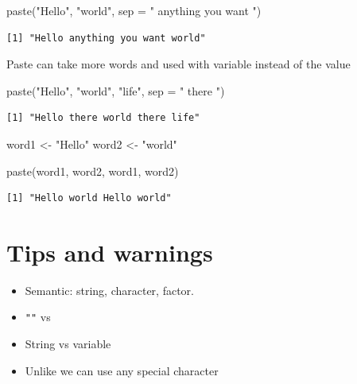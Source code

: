 \documentclass[
  letterpaper,
  DIV=11,
  numbers=noendperiod]{scrreprt}
\newenvironment{Shaded}{\begin{snugshade}}{\end{snugshade}}
\newcommand{\AttributeTok}[1]{\textcolor[rgb]{0.40,0.45,0.13}{#1}}
\newcommand{\FunctionTok}[1]{\textcolor[rgb]{0.28,0.35,0.67}{#1}}
\newcommand{\NormalTok}[1]{\textcolor[rgb]{0.00,0.23,0.31}{#1}}
\newcommand{\OtherTok}[1]{\textcolor[rgb]{0.00,0.23,0.31}{#1}}
\newcommand{\StringTok}[1]{\textcolor[rgb]{0.13,0.47,0.30}{#1}}
\providecommand{\tightlist}{%
  \setlength{\itemsep}{0pt}\setlength{\parskip}{0pt}}
\begin{document}
\begin{Shaded}
\begin{Highlighting}[]
\FunctionTok{paste}\NormalTok{(}\StringTok{"Hello"}\NormalTok{, }\StringTok{"world"}\NormalTok{, }\AttributeTok{sep =} \StringTok{" anything you want "}\NormalTok{)}
\end{Highlighting}
\end{Shaded}

\begin{verbatim}
[1] "Hello anything you want world"
\end{verbatim}

Paste can take more words and used with variable instead of the value

\begin{Shaded}
\begin{Highlighting}[]
\FunctionTok{paste}\NormalTok{(}\StringTok{"Hello"}\NormalTok{, }\StringTok{"world"}\NormalTok{, }\StringTok{"life"}\NormalTok{, }\AttributeTok{sep =} \StringTok{" there "}\NormalTok{)}
\end{Highlighting}
\end{Shaded}

\begin{verbatim}
[1] "Hello there world there life"
\end{verbatim}

\begin{Shaded}
\begin{Highlighting}[]
\NormalTok{word1 }\OtherTok{\textless{}{-}} \StringTok{"Hello"}
\NormalTok{word2 }\OtherTok{\textless{}{-}} \StringTok{"world"}

\FunctionTok{paste}\NormalTok{(word1, word2, word1, word2)}
\end{Highlighting}
\end{Shaded}

\begin{verbatim}
[1] "Hello world Hello world"
\end{verbatim}

\section*{Tips and warnings}\label{tips-and-warnings-24}


\begin{itemize}
\tightlist
\item
  Semantic: string, character, factor.
\item
  \texttt{""} vs \texttt{\textquotesingle{}\textquotesingle{}}
\item
  String vs variable
\item
  Unlike we can use any special character
\end{itemize}
\end{document}
